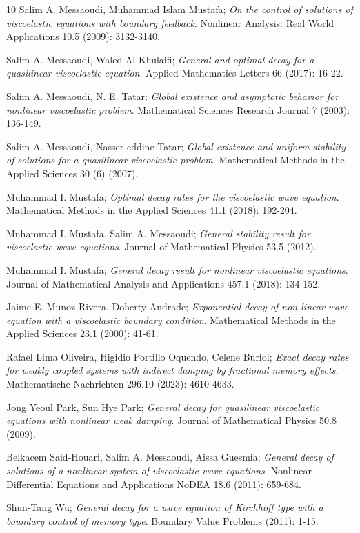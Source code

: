 \documentclass[reqno]{amsart}
\begin{document}
\begin{thebibliography}{10}
 Salim A. Messaoudi,  Muhammad Islam Mustafa;
\emph{On the control of solutions of viscoelastic equations with boundary feedback}.
 Nonlinear Analysis: Real World Applications 10.5 (2009): 3132-3140.
 
 Salim A. Messaoudi, Waled Al-Khulaifi;
\emph{General and optimal decay for a quasilinear viscoelastic equation}.
Applied Mathematics Letters 66 (2017): 16-22.

 Salim A. Messaoudi,  N. E. Tatar;
\emph{Global existence and asymptotic behavior for nonlinear viscoelastic problem}.
 Mathematical Sciences Research Journal 7 (2003): 136-149.
 
 Salim A. Messaoudi,  Nasser-eddine Tatar;
\emph{Global existence and uniform stability of solutions for a quasilinear 
viscoelastic problem}. Mathematical Methods in the Applied Sciences 30 (6) (2007).

 Muhammad I. Mustafa;
\emph{Optimal decay rates for the viscoelastic wave equation}.
 Mathematical Methods in the Applied Sciences 41.1 (2018): 192-204.
 
 Muhammad I. Mustafa, Salim A. Messaoudi;
\emph{General stability result for viscoelastic wave equations}.
 Journal of Mathematical Physics 53.5 (2012).
 
 Muhammad I. Mustafa;
\emph{General decay result for nonlinear viscoelastic equations}.
 Journal of Mathematical Analysis and Applications 457.1 (2018): 134-152.
 
  Jaime E. Munoz Rivera, Doherty Andrade;
\emph{Exponential decay of non-linear wave equation with a viscoelastic boundary 
condition}. Mathematical Methods in the Applied Sciences 23.1 (2000): 41-61.


 Rafael Lima Oliveira, Higidio Portillo Oquendo, Celene Buriol;
\emph{Exact decay rates for weakly coupled systems with indirect damping by 
fractional memory effects}. Mathematische Nachrichten 296.10 (2023): 4610-4633.

 Jong Yeoul Park, Sun Hye Park;
\emph{General decay for quasilinear viscoelastic equations with nonlinear weak damping}.
 Journal of Mathematical Physics 50.8 (2009).
 
  Belkacem Said-Houari, Salim A. Messaoudi, Aissa Guesmia;
\emph{General decay of solutions of a nonlinear system of viscoelastic wave equations}.
Nonlinear Differential Equations and Applications NoDEA 18.6 (2011): 659-684.

 Shun-Tang Wu;
\emph{General decay for a wave equation of Kirchhoff type with a boundary control 
of memory type}. Boundary Value Problems (2011): 1-15.

\end{thebibliography}
\end{document}
